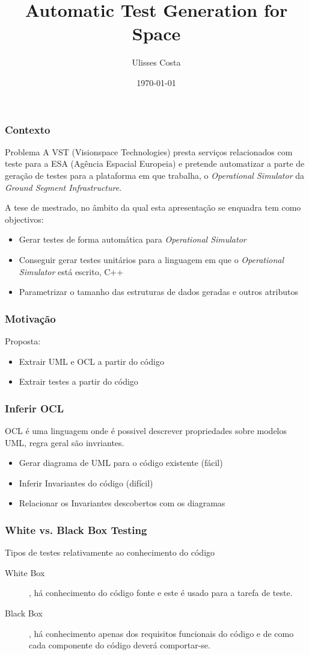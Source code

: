 \documentclass{beamer}
\title{Automatic Test Generation for Space}
\author{Ulisses Costa}
\date{\today}
\begin{document}
\begin{frame}
   \titlepage
\end{frame}

\begin{frame}\frametitle{Contexto}
\begin{block}{Problema}
A VST (Visionspace Technologies) presta serviços relacionados com teste para a ESA (Agência Espacial Europeia) e pretende automatizar
a parte de geração de testes para a plataforma em que trabalha, o \textit{Operational Simulator} da \textit{Ground Segment Infrastructure}.
\end{block}{}

A tese de mestrado, no âmbito da qual esta apresentação se enquadra tem como objectivos:
\begin{itemize}
\item Gerar testes de forma automática para \textit{Operational Simulator}
\item Conseguir gerar testes unitários para a linguagem em que o \textit{Operational Simulator} está escrito, C++
\item Parametrizar o tamanho das estruturas de dados geradas e outros atributos
\end{itemize}
\end{frame}

\begin{frame}\frametitle{Motivação}
Proposta:
\begin{itemize}
\item Extrair UML e OCL a partir do código
\item Extrair testes a partir do código
\end{itemize}
\end{frame}

\begin{frame}\frametitle{Inferir OCL}
OCL é uma linguagem onde é possivel descrever propriedades sobre modelos UML, regra geral são invriantes.\\
\begin{itemize}
\item Gerar diagrama de UML para o código existente (fácil)
\item Inferir Invariantes do código (difícil)
\item Relacionar os Invariantes descobertos com os diagramas
\end{itemize}
\end{frame}

\begin{frame}\frametitle{White vs. Black Box Testing}
\begin{block}{Tipos de testes relativamente ao conhecimento do código}
\begin{description}
\item[White Box], há conhecimento do código fonte e este é usado para a tarefa de teste.
\item[Black Box], há conhecimento apenas dos requisitos funcionais do código e de como cada componente do código deverá comportar-se.
\end{description}
\end{block}
\end{frame}
\end{document}
